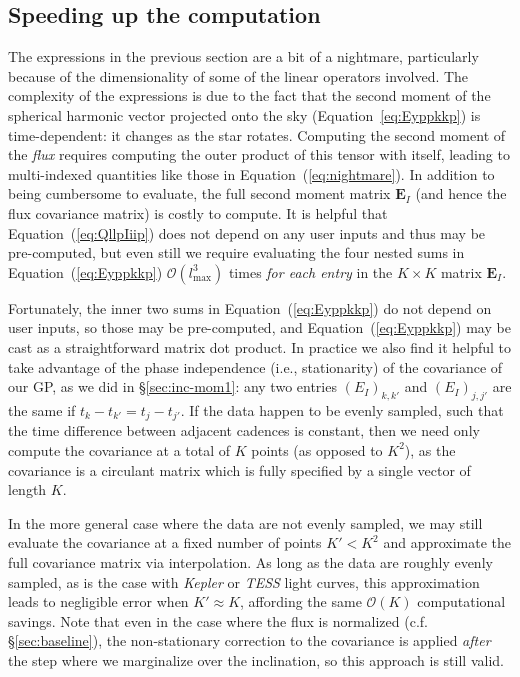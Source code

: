 \documentclass[modern]{aastex62}
\begin{document}
\subsection{Speeding up the computation}
\label{sec:inc-speedup}
%
The expressions in the previous section are a bit of a nightmare,
particularly because of the dimensionality of some of the linear
operators involved. The complexity of the expressions is due to
the fact that the second moment of the spherical harmonic vector
projected onto the sky (Equation~\ref{eq:Eyppkkp}) is time-dependent:
it changes as the star rotates. Computing the second moment of the
\emph{flux} requires computing the outer product of this tensor
with itself, leading to multi-indexed quantities like those in
Equation~(\ref{eq:nightmare}). In addition to being cumbersome to
evaluate, the full second moment matrix $\mathbf{E}_I$
(and hence the flux covariance matrix) is costly to compute.
It is helpful that Equation~(\ref{eq:QllpIiip}) does not depend
on any user inputs and thus may be pre-computed, but even still
we require evaluating the four nested sums
in Equation~(\ref{eq:Eyppkkp})
$\mathcal{O}(l_\mathrm{max}^3)$ times
\emph{for each entry} in the $K \times K$ matrix $\mathbf{E}_I$.

Fortunately, the inner two sums in Equation~(\ref{eq:Eyppkkp})
do not depend on user inputs, so those may be pre-computed,
and Equation~(\ref{eq:Eyppkkp}) may be cast as a straightforward
matrix dot product. In practice we also find it helpful to
take advantage of the phase independence (i.e., stationarity)
of the covariance of our GP, as we did in \S\ref{sec:inc-mom1}:
any two entries $(E_I)_{k,k'}$ and $(E_I)_{j,j'}$ are
the same if $t_{k} - t_{k'} = t_{j} - t_{j'}$. If the data
happen to be evenly sampled, such that the time difference between
adjacent cadences is constant, then we need only compute the
covariance at a total of $K$ points (as opposed to $K^2$), as the
covariance is a circulant matrix which is fully specified by a
single vector of length $K$.

In the more general case where the data are not evenly sampled,
we may still evaluate the covariance at a fixed number of points
$K' < K^2$ and approximate the full covariance matrix via
interpolation. As long as the data are roughly evenly sampled,
as is the case with \emph{Kepler} or \emph{TESS} light curves,
this approximation leads to negligible error when $K' \approx K$,
affording the same $\mathcal{O}(K)$ computational savings.
Note that even in the case where the flux is normalized
(c.f. \S\ref{sec:baseline}), the non-stationary correction to the
covariance is applied \emph{after} the step where we marginalize
over the inclination, so this approach is still valid.
\end{document}
